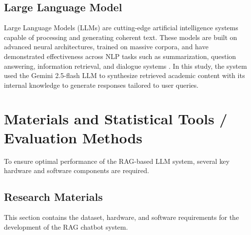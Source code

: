 \begin{refsection}
\subsection{Large Language Model}

Large Language Models (LLMs) are cutting-edge artificial intelligence systems capable of processing and generating coherent text. These models are built on advanced neural architectures, trained on massive corpora, and have demonstrated effectiveness across NLP tasks such as summarization, question answering, information retrieval, and dialogue systems \citeauthor{naveed2024} \citeyear{naveed2024}. In this study, the system used the Gemini 2.5-flash LLM to synthesize retrieved academic content with its internal knowledge to generate responses tailored to user queries.



\section{Materials and Statistical Tools / Evaluation Methods}

To ensure optimal performance of the RAG-based LLM system, several key hardware and software components are required.

\subsection{Research Materials}

This section contains the dataset, hardware, and software requirements for the development of the RAG chatbot system.


\end{refsection}
